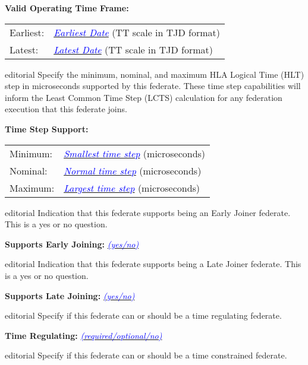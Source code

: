 \documentclass[11pt,english,letterpaper]{article}
\newcommand{\example}[1]{{\textcolor{blue}{\textit{#1}}}}
\begin{document}
\textbf{Valid Operating Time Frame: }

\hspace{0.25in}
\begin{tabular}{ll}
Earliest:& \underline{\example{Earliest Date}} (TT scale in TJD format)\\
Latest:  & \underline{\example{Latest Date}} (TT scale in TJD format)
\end{tabular}

\begin{shownto}{editorial}
{\color{red}Specify the minimum, nominal, and maximum HLA Logical Time (HLT)
step in microseconds supported by this federate. These time step capabilities
will inform the Least Common Time Step (LCTS) calculation for any federation
execution that this federate joins.}
\end{shownto}

\textbf{Time Step Support: }

\hspace{0.25in}
\begin{tabular}{ll}
Minimum: & \underline{\example{Smallest time step}} (microseconds)\\
Nominal: & \underline{\example{Normal time step}} (microseconds)\\
Maximum: & \underline{\example{Largest time step}} (microseconds)
\end{tabular}

\begin{shownto}{editorial}
{\color{red} Indication that this federate supports being an Early Joiner
federate. This is a yes or no question.}
\end{shownto}

\textbf{Supports Early Joining: } \underline{ \example{(yes/no)}}

\begin{shownto}{editorial}
{\color{red} Indication that this federate supports being a Late Joiner
federate. This is a yes or no question.}
\end{shownto}

\textbf{Supports Late Joining: } \underline{ \example{(yes/no)}}

\begin{shownto}{editorial}
{\color{red} Specify if this federate can or should be a time regulating federate.}
\end{shownto}

\textbf{Time Regulating: } \underline{ \example{(required/optional/no)}}

\begin{shownto}{editorial}
{\color{red} Specify if this federate can or should be a time constrained federate.}
\end{shownto}
\end{document}

